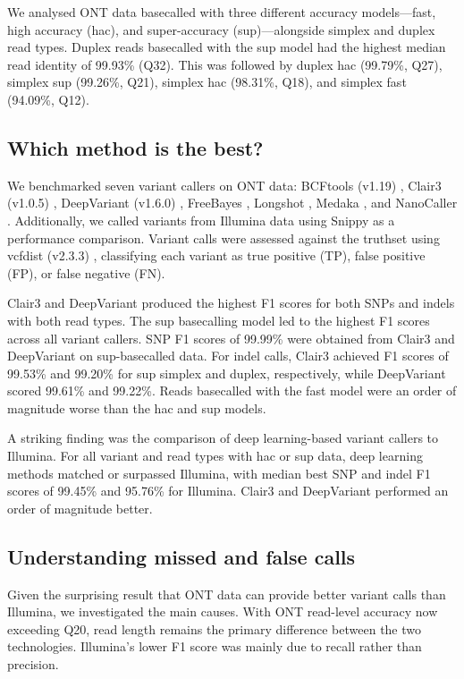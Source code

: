 \documentclass[11pt]{article}
\begin{document}
We analysed ONT data basecalled with three different accuracy models---fast, high accuracy (hac), and super-accuracy (sup)---alongside simplex and duplex read types. Duplex reads basecalled with the sup model had the highest median read identity of 99.93\% (Q32). This was followed by duplex hac (99.79\%, Q27), simplex sup (99.26\%, Q21), simplex hac (98.31\%, Q18), and simplex fast (94.09\%, Q12).

\subsection{Which method is the best?}

We benchmarked seven variant callers on ONT data: BCFtools (v1.19) \citep{danecek2021}, Clair3 (v1.0.5) \citep{zheng2022}, DeepVariant (v1.6.0) \citep{poplin2018}, FreeBayes \citep{garrison2012}, Longshot \citep{edge2019}, Medaka \citep{medaka2023}, and NanoCaller \citep{ahsan2021}. Additionally, we called variants from Illumina data using Snippy \citep{seemann2015} as a performance comparison. Variant calls were assessed against the truthset using vcfdist (v2.3.3) \citep{dunn2023}, classifying each variant as true positive (TP), false positive (FP), or false negative (FN).

Clair3 and DeepVariant produced the highest F1 scores for both SNPs and indels with both read types. The sup basecalling model led to the highest F1 scores across all variant callers. SNP F1 scores of 99.99\% were obtained from Clair3 and DeepVariant on sup-basecalled data. For indel calls, Clair3 achieved F1 scores of 99.53\% and 99.20\% for sup simplex and duplex, respectively, while DeepVariant scored 99.61\% and 99.22\%. Reads basecalled with the fast model were an order of magnitude worse than the hac and sup models.

A striking finding was the comparison of deep learning-based variant callers to Illumina. For all variant and read types with hac or sup data, deep learning methods matched or surpassed Illumina, with median best SNP and indel F1 scores of 99.45\% and 95.76\% for Illumina. Clair3 and DeepVariant performed an order of magnitude better.

\subsection{Understanding missed and false calls}

Given the surprising result that ONT data can provide better variant calls than Illumina, we investigated the main causes. With ONT read-level accuracy now exceeding Q20, read length remains the primary difference between the two technologies. Illumina's lower F1 score was mainly due to recall rather than precision.
\end{document}

